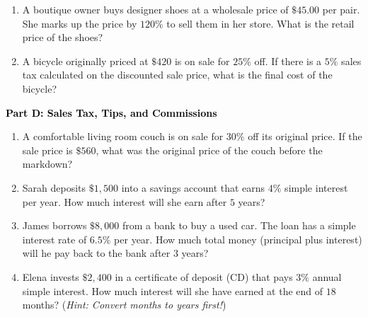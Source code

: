 \documentclass[12pt, letterpaper, fleqn]{article}
\begin{document}
\vspace{3mm}

\begin{enumerate}[itemsep=5.5cm, leftmargin=0.6cm, resume]
\item A boutique owner buys designer shoes at a wholesale price of $\$45.00$ per pair. She marks up the price by $120\%$ to sell them in her store. What is the retail price of the shoes?
\item A bicycle originally priced at $\$420$ is on sale for $25\%$ off. If there is a $5\%$ sales tax calculated on the discounted sale price, what is the final cost of the bicycle?
\end{enumerate}

\newpage

\begin{tcolorbox}[colback=customteal!20]
\large\textcolor{black}{\textbf{Part D: Sales Tax, Tips, and Commissions}}
\end{tcolorbox}

\vspace{3mm}

\begin{enumerate}[itemsep=5.5cm, leftmargin=0.6cm, resume]
\item A comfortable living room couch is on sale for $30\%$ off its original price. If the sale price is $\$560$, what was the original price of the couch before the markdown?
\item Sarah deposits $\$1,500$ into a savings account that earns $4\%$ simple interest per year. How much interest will she earn after $5$ years?
\item James borrows $\$8,000$ from a bank to buy a used car. The loan has a simple interest rate of $6.5\%$ per year. How much total money (principal plus interest) will he pay back to the bank after $3$ years?
\item Elena invests $\$2,400$ in a certificate of deposit (CD) that pays $3\%$ annual simple interest. How much interest will she have earned at the end of $18$ months? (\textit{Hint: Convert months to years first!})
\end{enumerate}
\end{document}
